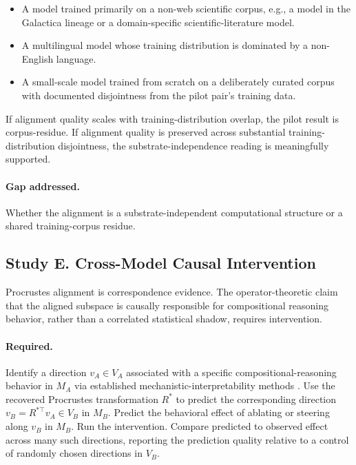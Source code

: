 \begin{itemize}
    \item A model trained primarily on a non-web scientific corpus,
        e.g., a model in the Galactica \cite{taylor2022galactica}
        lineage or a domain-specific scientific-literature model.
    \item A multilingual model whose training distribution is
        dominated by a non-English language.
    \item A small-scale model trained from scratch on a deliberately
        curated corpus with documented disjointness from the pilot
        pair's training data.
\end{itemize}

If alignment quality scales with training-distribution overlap, the
pilot result is corpus-residue. If alignment quality is preserved
across substantial training-distribution disjointness, the
substrate-independence reading is meaningfully supported.

\paragraph{Gap addressed.} Whether the alignment is a substrate-independent
computational structure or a shared training-corpus residue.

\subsection{Study E. Cross-Model Causal Intervention}

Procrustes alignment is correspondence evidence. The
operator-theoretic claim that the aligned subspace is causally
responsible for compositional reasoning behavior, rather than a
correlated statistical shadow, requires intervention.

\paragraph{Required.} Identify a direction $v_A \in V_A$ associated
with a specific compositional-reasoning behavior in $M_A$ via
established mechanistic-interpretability methods
\cite{wang2023interpretability, conmy2023towards, marks2024sparse,
meng2022rome}. Use the recovered Procrustes transformation $R^*$ to
predict the corresponding direction $v_B = R^{*\top} v_A \in V_B$ in
$M_B$. Predict the behavioral effect of ablating or steering along
$v_B$ in $M_B$. Run the intervention. Compare predicted to observed
effect across many such directions, reporting the prediction quality
relative to a control of randomly chosen directions in $V_B$.

